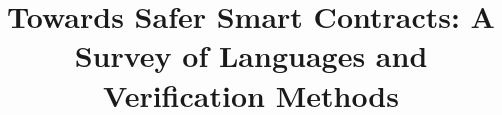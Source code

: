 \title{Towards Safer Smart Contracts: A Survey of Languages and Verification Methods}



\maketitle














